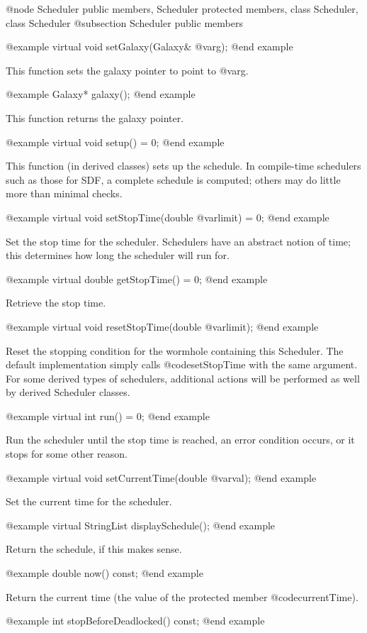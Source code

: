 @node Scheduler public members, Scheduler protected members, class Scheduler, class Scheduler
@subsection Scheduler public members

@example
virtual void setGalaxy(Galaxy& @var{g});
@end example

This function sets the galaxy pointer to point to @var{g}.

@example
Galaxy* galaxy();
@end example

This function returns the galaxy pointer.

@example
virtual void setup() = 0;
@end example

This function (in derived classes) sets up the schedule.  In
compile-time schedulers such as those for SDF, a complete schedule is
computed; others may do little more than minimal checks.

@example
virtual void setStopTime(double @var{limit}) = 0;
@end example

Set the stop time for the scheduler.  Schedulers have an abstract
notion of time; this determines how long the scheduler will run for.

@example
virtual double getStopTime() = 0;
@end example

Retrieve the stop time.

@example
virtual void resetStopTime(double @var{limit});
@end example

Reset the stopping condition for the wormhole containing this Scheduler.
The default implementation simply calls @code{setStopTime} with
the same argument.  For some derived types of schedulers, additional
actions will be performed as well by derived Scheduler classes.

@example
virtual int run() = 0;
@end example

Run the scheduler until the stop time is reached, an error condition
occurs, or it stops for some other reason.

@example
virtual void setCurrentTime(double @var{val});
@end example

Set the current time for the scheduler.

@example
virtual StringList displaySchedule();
@end example

Return the schedule, if this makes sense.

@example
double now() const;
@end example

Return the current time (the value of the protected member
@code{currentTime}).

@example
int stopBeforeDeadlocked() const;
@end example

